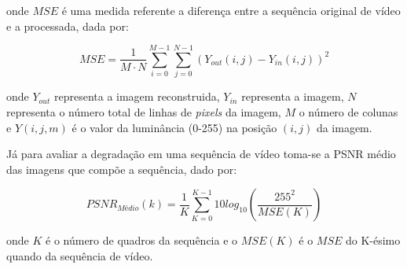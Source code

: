 \noindent onde $MSE$ é uma medida referente a diferença entre a sequência original de vídeo e a processada, dada por:
\vspace{-5mm}
\begin{center}
	\begin{equation}
		MSE = \displaystyle\frac{1}{M\cdot N}\sum_{i=0}^{M-1}\sum_{j=0}^{N-1} (Y_{out}(i,j) - Y_{in}(i,j))^2 
	\end{equation}
\end{center} 	
onde $Y_{out}$ representa a imagem reconstruida, $Y_{in}$ representa a imagem, $N$ representa o número total de linhas de \textit{pixels} da imagem, $M$ o número de colunas  e $Y(i,j,m)$ é o valor  da luminância (0-255) na posição $(i,j)$ da imagem.

Já para avaliar a degradação em uma sequência de vídeo toma-se a PSNR médio das imagens que compõe a sequência, dado por:
\vspace{-5mm}
\begin{center}
	\begin{equation}
		PSNR_{Médio}(k) = \displaystyle\frac{1}{K}\sum_{K=0}^{K-1} 10log_{10}\left(\frac{255^2}{MSE(K)}\right)
	\end{equation}
\end{center}

\noindent onde $K$ é o número de quadros da sequência e o $MSE(K)$ é o $MSE$ do K-ésimo quando da sequência de vídeo.

